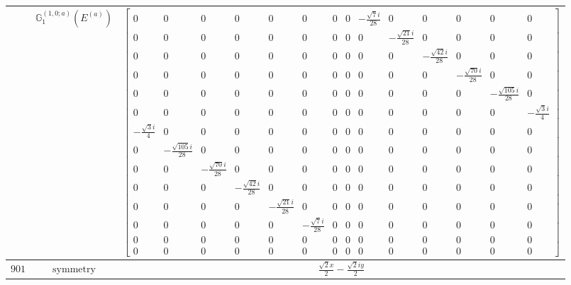 \documentclass[fleqn,8pt,landscape]{jsarticle}
\begin{document}
\begin{longtable}{ccc}
$  $ & $ \mathbb{G}_{1}^{(1,0;a)}(E^{(a)}) $ & $ \begin{bmatrix} 0 & 0 & 0 & 0 & 0 & 0 & 0 & 0 & - \frac{\sqrt{7} i}{28} & 0 & 0 & 0 & 0 & 0 \\ 0 & 0 & 0 & 0 & 0 & 0 & 0 & 0 & 0 & - \frac{\sqrt{21} i}{28} & 0 & 0 & 0 & 0 \\ 0 & 0 & 0 & 0 & 0 & 0 & 0 & 0 & 0 & 0 & - \frac{\sqrt{42} i}{28} & 0 & 0 & 0 \\ 0 & 0 & 0 & 0 & 0 & 0 & 0 & 0 & 0 & 0 & 0 & - \frac{\sqrt{70} i}{28} & 0 & 0 \\ 0 & 0 & 0 & 0 & 0 & 0 & 0 & 0 & 0 & 0 & 0 & 0 & - \frac{\sqrt{105} i}{28} & 0 \\ 0 & 0 & 0 & 0 & 0 & 0 & 0 & 0 & 0 & 0 & 0 & 0 & 0 & - \frac{\sqrt{3} i}{4} \\ - \frac{\sqrt{3} i}{4} & 0 & 0 & 0 & 0 & 0 & 0 & 0 & 0 & 0 & 0 & 0 & 0 & 0 \\ 0 & - \frac{\sqrt{105} i}{28} & 0 & 0 & 0 & 0 & 0 & 0 & 0 & 0 & 0 & 0 & 0 & 0 \\ 0 & 0 & - \frac{\sqrt{70} i}{28} & 0 & 0 & 0 & 0 & 0 & 0 & 0 & 0 & 0 & 0 & 0 \\ 0 & 0 & 0 & - \frac{\sqrt{42} i}{28} & 0 & 0 & 0 & 0 & 0 & 0 & 0 & 0 & 0 & 0 \\ 0 & 0 & 0 & 0 & - \frac{\sqrt{21} i}{28} & 0 & 0 & 0 & 0 & 0 & 0 & 0 & 0 & 0 \\ 0 & 0 & 0 & 0 & 0 & - \frac{\sqrt{7} i}{28} & 0 & 0 & 0 & 0 & 0 & 0 & 0 & 0 \\ 0 & 0 & 0 & 0 & 0 & 0 & 0 & 0 & 0 & 0 & 0 & 0 & 0 & 0 \\ 0 & 0 & 0 & 0 & 0 & 0 & 0 & 0 & 0 & 0 & 0 & 0 & 0 & 0 \end{bmatrix} $ \\ \hline
$ 901 $ & $ \text{symmetry} $ & $ \frac{\sqrt{2} x}{2} - \frac{\sqrt{2} i y}{2} $ \\

\end{longtable}
\end{document}

